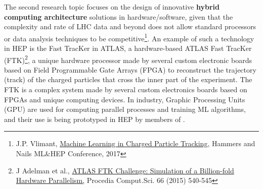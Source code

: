 The second research topic focuses on the design of innovative \textbf{hybrid computing architecture} solutions in hardware/software, given that the complexity and rate of LHC data and beyond does not allow standard processors or data analysis techniques to be competitive\footnote{J.P. Vlimant, \href{https://erez.weizmann.ac.il/pls/htmldb/f?p=101:58:::NO:RP:P58_CODE,P58_FILE:5393,Y}{Machine Learning in Charged Particle Tracking}, Hammers and Nails ML\&HEP Conference, 2017}. An example of such a technology in HEP is the Fast TracKer in ATLAS, a hardware-based ATLAS Fast TracKer (FTK)\footnote{J Adelman et al., \href{https://inspirehep.net/record/1614024/}{ATLAS FTK Challenge: Simulation of a Billion-fold Hardware Parallelism,} Procedia Comput.Sci. 66 (2015) 540-545}, a unique hardware processor made by several custom electronic boards based on Field Programmable Gate Arrays (FPGA) to reconstruct the trajectory (track) of the charged particles that cross the inner part of the experiment. The FTK is a complex system made by several custom electronics boards based on FPGAs and unique computing devices. In industry, Graphic Processing Units (GPU) are used for computing parallel processes and training ML algorithms, and their use is being prototyped in HEP by members of \acronym. 
\begin{center}
\vskip-15pt
\end{center}

